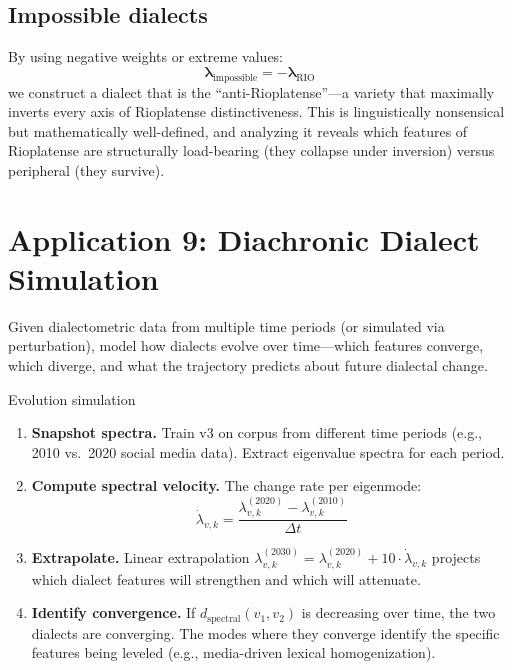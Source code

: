 \documentclass[11pt,a4paper]{article}
\begin{document}
\subsection{Impossible dialects}

By using negative weights or extreme values:
\[
\boldsymbol{\lambda}_{\text{impossible}}
= -\boldsymbol{\lambda}_{\text{RIO}}
\]
we construct a dialect that is the ``anti-Rioplatense''---a variety
that maximally inverts every axis of Rioplatense distinctiveness. This
is linguistically nonsensical but mathematically well-defined, and
analyzing it reveals which features of Rioplatense are structurally
load-bearing (they collapse under inversion) versus peripheral (they
survive).

\section{Application 9: Diachronic Dialect Simulation}
\label{sec:app-diachronic}

\begin{appbox}
Given dialectometric data from multiple time periods (or simulated
via perturbation), model how dialects evolve over time---which
features converge, which diverge, and what the trajectory predicts
about future dialectal change.
\end{appbox}

\begin{howbox}{Evolution simulation}
\begin{enumerate}[nosep]
  \item \textbf{Snapshot spectra.} Train v3 on corpus from different
    time periods (e.g., 2010 vs.\ 2020 social media data). Extract
    eigenvalue spectra for each period.

  \item \textbf{Compute spectral velocity.} The change rate per
    eigenmode:
    \[
    \dot{\lambda}_{v,k}
    = \frac{\lambda_{v,k}^{(2020)} - \lambda_{v,k}^{(2010)}}{\Delta t}
    \]

  \item \textbf{Extrapolate.} Linear extrapolation
    $\lambda_{v,k}^{(2030)} = \lambda_{v,k}^{(2020)}
    + 10 \cdot \dot{\lambda}_{v,k}$ projects which dialect features
    will strengthen and which will attenuate.

  \item \textbf{Identify convergence.} If $d_{\text{spectral}}(v_1,
    v_2)$ is decreasing over time, the two dialects are converging.
    The modes where they converge identify the specific features being
    leveled (e.g., media-driven lexical homogenization).
\end{enumerate}
\end{howbox}
\end{document}
